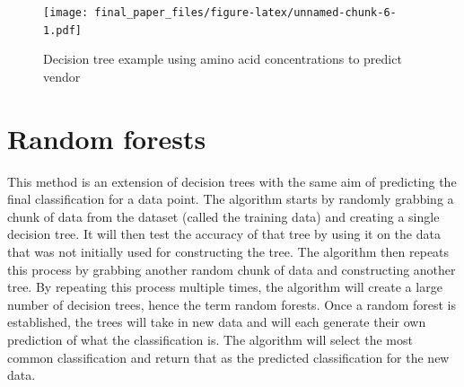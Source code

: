 \documentclass[12pt,openany]{book}
\newenvironment{Shaded}{\begin{snugshade}}{\end{snugshade}}
\newcommand{\KeywordTok}[1]{\textcolor[rgb]{0.13,0.29,0.53}{\textbf{#1}}}
\newcommand{\DataTypeTok}[1]{\textcolor[rgb]{0.13,0.29,0.53}{#1}}
\newcommand{\DecValTok}[1]{\textcolor[rgb]{0.00,0.00,0.81}{#1}}
\newcommand{\StringTok}[1]{\textcolor[rgb]{0.31,0.60,0.02}{#1}}
\newcommand{\OperatorTok}[1]{\textcolor[rgb]{0.81,0.36,0.00}{\textbf{#1}}}
\newcommand{\NormalTok}[1]{#1}
\begin{document}
\begin{Shaded}
\end{Shaded}

\begin{figure}
\centering
\texttt{[image: final\_paper\_files/figure-latex/unnamed-chunk-6-1.pdf]}
\caption{\label{fig:unnamed-chunk-6}Decision tree example using amino acid
concentrations to predict vendor}
\end{figure}

\section{Random forests}\label{random-forests}

This method is an extension of decision trees with the same aim of
predicting the final classification for a data point. The algorithm
starts by randomly grabbing a chunk of data from the dataset (called the
training data) and creating a single decision tree. It will then test
the accuracy of that tree by using it on the data that was not initially
used for constructing the tree. The algorithm then repeats this process
by grabbing another random chunk of data and constructing another tree.
By repeating this process multiple times, the algorithm will create a
large number of decision trees, hence the term random forests. Once a
random forest is established, the trees will take in new data and will
each generate their own prediction of what the classification is. The
algorithm will select the most common classification and return that as
the predicted classification for the new data.
\end{document}
